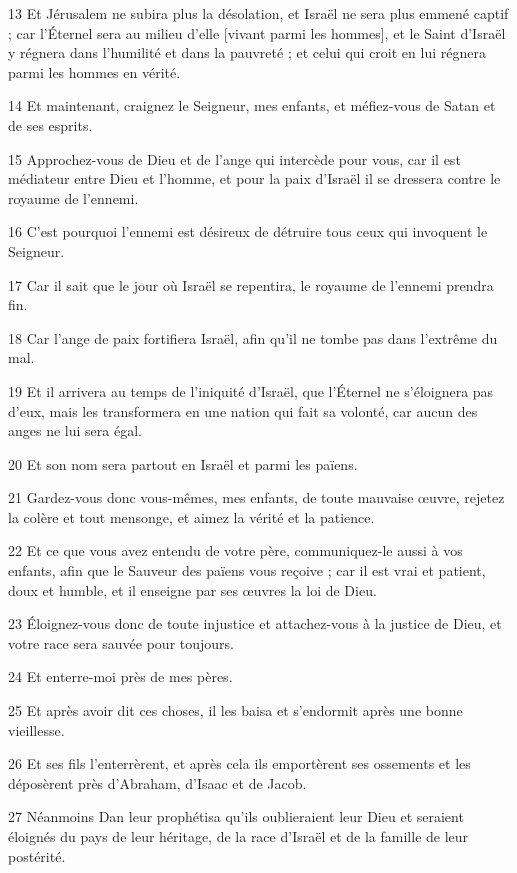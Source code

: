 \par 13 Et Jérusalem ne subira plus la désolation, et Israël ne sera plus emmené captif ; car l'Éternel sera au milieu d'elle [vivant parmi les hommes], et le Saint d'Israël y régnera dans l'humilité et dans la pauvreté ; et celui qui croit en lui régnera parmi les hommes en vérité.

\par 14 Et maintenant, craignez le Seigneur, mes enfants, et méfiez-vous de Satan et de ses esprits.

\par 15 Approchez-vous de Dieu et de l'ange qui intercède pour vous, car il est médiateur entre Dieu et l'homme, et pour la paix d'Israël il se dressera contre le royaume de l'ennemi.

\par 16 C'est pourquoi l'ennemi est désireux de détruire tous ceux qui invoquent le Seigneur.

\par 17 Car il sait que le jour où Israël se repentira, le royaume de l'ennemi prendra fin.

\par 18 Car l'ange de paix fortifiera Israël, afin qu'il ne tombe pas dans l'extrême du mal.

\par 19 Et il arrivera au temps de l'iniquité d'Israël, que l'Éternel ne s'éloignera pas d'eux, mais les transformera en une nation qui fait sa volonté, car aucun des anges ne lui sera égal.

\par 20 Et son nom sera partout en Israël et parmi les païens.

\par 21 Gardez-vous donc vous-mêmes, mes enfants, de toute mauvaise œuvre, rejetez la colère et tout mensonge, et aimez la vérité et la patience.

\par 22 Et ce que vous avez entendu de votre père, communiquez-le aussi à vos enfants, afin que le Sauveur des païens vous reçoive ; car il est vrai et patient, doux et humble, et il enseigne par ses œuvres la loi de Dieu.

\par 23 Éloignez-vous donc de toute injustice et attachez-vous à la justice de Dieu, et votre race sera sauvée pour toujours.

\par 24 Et enterre-moi près de mes pères.

\par 25 Et après avoir dit ces choses, il les baisa et s'endormit après une bonne vieillesse.

\par 26 Et ses fils l'enterrèrent, et après cela ils emportèrent ses ossements et les déposèrent près d'Abraham, d'Isaac et de Jacob.

\par 27 Néanmoins Dan leur prophétisa qu'ils oublieraient leur Dieu et seraient éloignés du pays de leur héritage, de la race d'Israël et de la famille de leur postérité.



